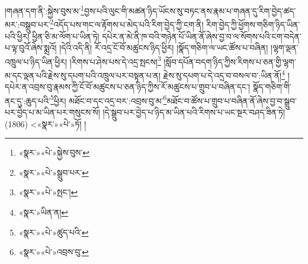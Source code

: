 །གཞན་དག་ནི་:སྐྱེས་བུས་མ་\footnote{«སྣར་»«པེ་»སྐྱེས་བུས་}བྱས་པའི་ལུང་གི་མཚན་ཉིད་ཡོངས་སུ་བཏང་ནས་རྣམ་པ་གཞན་དུ་རིག་བྱེད་ཚད་མར་:བསྒྲུབ་པར་\footnote{«སྣར་»«པེ་»སྒྲུབ་པར་}འདོད་པས་གང་ལ་རྟོགས་པ་མེད་པའི་རིག་བྱེད་ཀྱི་ངག་ནི། རིག་བྱེད་ཀྱི་ཕྱོགས་གཅིག་ཉིད་ཡིན་པའི་ཕྱིར། ཕྱིན་ཅི་མ་ལོག་པ་ཡིན་ཏེ། དཔེར་ན་མེ་ནི་ཁ་བའི་གཉེན་པོ་ཡིན་ནོ་ཞེས་བྱ་བ་ལ་སོགས་པའི་ངག་བདེན་པ་ལྟ་བུའོ་ཞེས་སྨྲའོ། །དེའི་འདི་ནི། རོ་འདྲ་ངོ་བོ་མཚུངས་ཉིད་ཕྱིར། །སྣོད་གཅིག་ལ་ཡང་ཚོས་པ་བཞིན། །ལྷག་ལྡན་འཁྲུལ་པ་ཉིད་ཡིན་ཕྱིར། །རིགས་པ་ཤེས་པས་དེ་འདྲ་སྤངས།\footnote{«སྣར་»«པེ་»སྤང་།} །སློབ་དཔོན་བདག་ཉིད་ཀྱིས་རིགས་པ་ཅན་གྱི་ལྷག་མ་དང་ལྡན་པའི་རྗེས་སུ་དཔག་པའི་འཁྲུལ་པར་བསྟན་པ་ན། རྗེས་སུ་དཔག་པ་དེ་འདྲ་བ་བསལ་བ་:ཡིན་ནོ།\footnote{«སྣར་»ཡིན་ན།} །དཔེར་ན་འབྲས་བུ་རྣམས་ཀྱི་ངོ་བོ་མཚུངས་པ་ཅན་ཉིད་ཀྱིས་རོ་མཚུངས་པ་གྲུབ་པ་བཞིན་དང་། སྣོད་གཅིག་གི་ནང་དུ་:ཆུད་པའི་\footnote{«སྣར་»«པེ་»ཚུད་པའི་}ཕྱིར། མཐོང་བ་དང་འདྲ་བར་:འབྲས་བུ་མ་\footnote{«སྣར་»«པེ་»འབྲས་བུ་}མཐོང་བ་ཚོས་པ་གྲུབ་པ་བཞིན་ནོ་ཞེས་བྱ་བ་སྒྲུབ་པར་བྱེད་པ་མ་ཡིན་པར་གསུངས་སོ། །དེ་སྒྲུབ་པར་བྱེད་པ་ཉིད་མ་ཡིན་པའི་རིགས་པ་ཡང་སྔར་བཤད་ཟིན་ཏེ། (1806) <«སྣར་»«པེ་»ཏོ། །
